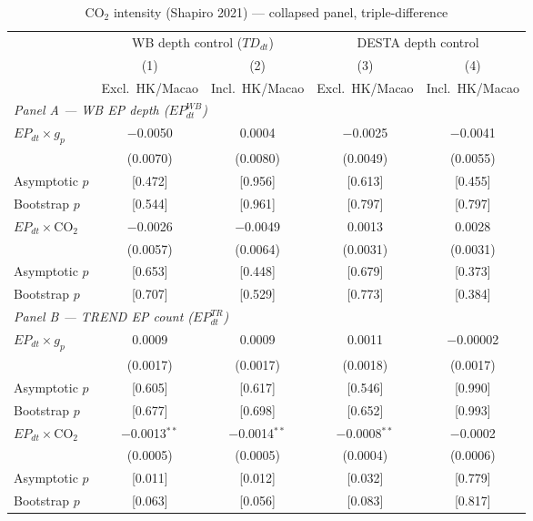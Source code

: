 \documentclass{article}
\begin{document}
\begin{table}[htbp]
\centering
\footnotesize
\caption{CO$_2$ intensity (Shapiro 2021) --- collapsed panel, triple-difference}
\label{tab:co2}
\begin{threeparttable}
\begin{tabular}{lcccc}
\toprule
 & \multicolumn{2}{c}{WB depth control ($TD_{dt}$)} & \multicolumn{2}{c}{DESTA depth control} \\
\cmidrule(lr){2-3}\cmidrule(lr){4-5}
 & (1) & (2) & (3) & (4) \\
 & Excl.\ HK/Macao & Incl.\ HK/Macao & Excl.\ HK/Macao & Incl.\ HK/Macao \\
\midrule
\multicolumn{5}{l}{\textit{Panel A --- WB EP depth ($EP^{WB}_{dt}$)}} \\[3pt]
$EP_{dt} \times g_p$ & $-$0.0050 & 0.0004 & $-$0.0025 & $-$0.0041 \\
 & (0.0070) & (0.0080) & (0.0049) & (0.0055) \\[2pt]
\quad Asymptotic $p$ & [0.472] & [0.956] & [0.613] & [0.455] \\
\quad Bootstrap $p$ & [0.544] & [0.961] & [0.797] & [0.797] \\[6pt]
$EP_{dt} \times \text{CO}_2$ & $-$0.0026 & $-$0.0049 & 0.0013 & 0.0028 \\
 & (0.0057) & (0.0064) & (0.0031) & (0.0031) \\[2pt]
\quad Asymptotic $p$ & [0.653] & [0.448] & [0.679] & [0.373] \\
\quad Bootstrap $p$ & [0.707] & [0.529] & [0.773] & [0.384] \\[6pt]
\midrule
\multicolumn{5}{l}{\textit{Panel B --- TREND EP count ($EP^{TR}_{dt}$)}} \\[3pt]
$EP_{dt} \times g_p$ & 0.0009 & 0.0009 & 0.0011 & $-$0.00002 \\
 & (0.0017) & (0.0017) & (0.0018) & (0.0017) \\[2pt]
\quad Asymptotic $p$ & [0.605] & [0.617] & [0.546] & [0.990] \\
\quad Bootstrap $p$ & [0.677] & [0.698] & [0.652] & [0.993] \\[6pt]
$EP_{dt} \times \text{CO}_2$ & $-$0.0013$^{**}$ & $-$0.0014$^{**}$ & $-$0.0008$^{**}$ & $-$0.0002 \\
 & (0.0005) & (0.0005) & (0.0004) & (0.0006) \\[2pt]
\quad Asymptotic $p$ & [0.011] & [0.012] & [0.032] & [0.779] \\
\quad Bootstrap $p$ & [0.063] & [0.056] & [0.083] & [0.817] \\[6pt]

\end{tabular}
\end{threeparttable}
\end{table}
\end{document}
